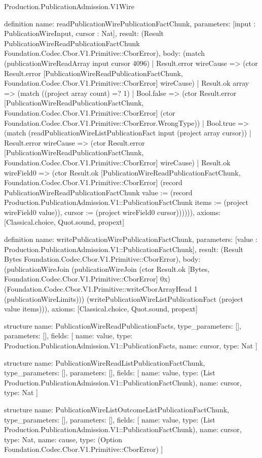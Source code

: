 \begin{lexlean}{Production.PublicationAdmission.V1Wire}
\begin{semanticmodule}
definition{
  name: readPublicationWirePublicationFactChunk,
  parameters: [input : PublicationWireInput, cursor : Nat],
  result: (Result PublicationWireReadPublicationFactChunk Foundation.Codec.Cbor.V1.Primitive::CborError),
  body: (match (publicationWireReadArray input cursor 4096)
    | Result.error wireCause => (ctor Result.error [PublicationWireReadPublicationFactChunk, Foundation.Codec.Cbor.V1.Primitive::CborError] wireCause)
    | Result.ok array => (match ((project array count) =? 1)
      | Bool.false => (ctor Result.error [PublicationWireReadPublicationFactChunk, Foundation.Codec.Cbor.V1.Primitive::CborError] (ctor Foundation.Codec.Cbor.V1.Primitive::CborError.WrongType))
      | Bool.true => (match (readPublicationWireListPublicationFact input (project array cursor))
        | Result.error wireCause => (ctor Result.error [PublicationWireReadPublicationFactChunk, Foundation.Codec.Cbor.V1.Primitive::CborError] wireCause)
        | Result.ok wireField0 => (ctor Result.ok [PublicationWireReadPublicationFactChunk, Foundation.Codec.Cbor.V1.Primitive::CborError] (record PublicationWireReadPublicationFactChunk {value := (record Production.PublicationAdmission.V1::PublicationFactChunk {items := (project wireField0 value)}), cursor := (project wireField0 cursor)}))))),
  axioms: [Classical.choice, Quot.sound, propext]
}

definition{
  name: writePublicationWirePublicationFactChunk,
  parameters: [value : Production.PublicationAdmission.V1::PublicationFactChunk],
  result: (Result Bytes Foundation.Codec.Cbor.V1.Primitive::CborError),
  body: (publicationWireJoin (publicationWireJoin (ctor Result.ok [Bytes, Foundation.Codec.Cbor.V1.Primitive::CborError] 0x) (Foundation.Codec.Cbor.V1.Primitive::writeCborArrayHead 1 (publicationWireLimits))) (writePublicationWireListPublicationFact (project value items))),
  axioms: [Classical.choice, Quot.sound, propext]
}

structure{
  name: PublicationWireReadPublicationFacts,
  type_parameters: [],
  parameters: [],
  fields: [
    {name: value, type: Production.PublicationAdmission.V1::PublicationFacts},
    {name: cursor, type: Nat}
  ]
}

structure{
  name: PublicationWireReadListPublicationFactChunk,
  type_parameters: [],
  parameters: [],
  fields: [
    {name: value, type: (List Production.PublicationAdmission.V1::PublicationFactChunk)},
    {name: cursor, type: Nat}
  ]
}

structure{
  name: PublicationWireListOutcomeListPublicationFactChunk,
  type_parameters: [],
  parameters: [],
  fields: [
    {name: value, type: (List Production.PublicationAdmission.V1::PublicationFactChunk)},
    {name: cursor, type: Nat},
    {name: cause, type: (Option Foundation.Codec.Cbor.V1.Primitive::CborError)}
  ]
}


\end{semanticmodule}
\end{lexlean}
